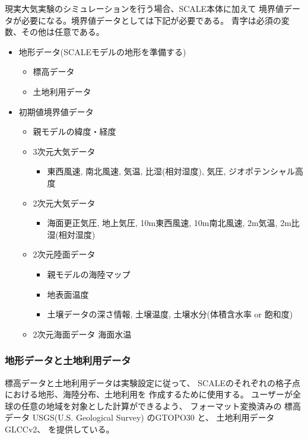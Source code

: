 現実大気実験のシミュレーションを行う場合、SCALE本体に加えて
境界値データが必要になる。境界値データとしては下記が必要である。
{\color{blue}青字}は必須の変数、その他は任意である。

\begin{itemize}
\item 地形データ(SCALEモデルの地形を準備する)
 \begin{itemize}
  \item {\color{blue}標高データ}
  \item {\color{blue}土地利用データ}
 \end{itemize}
\item 初期値境界値データ
 \begin{itemize}
   \item {\color{blue}親モデルの緯度・経度}
   \item 3次元大気データ
     \begin{itemize}
       \item {\color{blue}東西風速, 南北風速, 気温, 比湿(相対湿度), 気圧, ジオポテンシャル高度}
     \end{itemize}
   \item 2次元大気データ
     \begin{itemize}
       \item 海面更正気圧, 地上気圧, 10m東西風速, 10m南北風速, 2m気温, 2m比湿(相対湿度)
     \end{itemize}
   \item 2次元陸面データ
     \begin{itemize}
       \item 親モデルの海陸マップ
       \item {\color{blue}地表面温度}
       \item {\color{blue}土壌データの深さ情報, 土壌温度}, 土壌水分(体積含水率 or 飽和度)
     \end{itemize}
   \item 2次元海面データ 海面水温
 \end{itemize}
\end{itemize}


\subsubsection{地形データと土地利用データ}
標高データと土地利用データは実験設定に従って、
SCALEのそれぞれの格子点における地形、海陸分布、土地利用を
作成するために使用する。
ユーザーが全球の任意の地域を対象とした計算ができるよう、
フォーマット変換済みの
標高データ USGS(U.S. Geological Survey) のGTOPO30 と、
土地利用データ GLCCv2、
を提供している。

